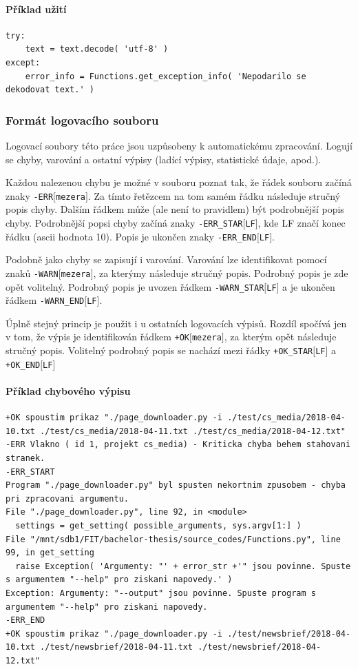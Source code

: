 \paragraph{Příklad užití}
\begin{lstlisting}
try:
    text = text.decode( 'utf-8' )
except:
    error_info = Functions.get_exception_info( 'Nepodarilo se dekodovat text.' )
\end{lstlisting}

\subsubsection{Formát logovacího souboru}
Logovací soubory této práce jsou uzpůsobeny k automatickému zpracování. Logují se
chyby, varování a ostatní výpisy (ladící výpisy, statistické údaje, apod.).

Každou nalezenou chybu je možné v souboru poznat tak, že řádek souboru
začíná znaky \texttt{-ERR$[$mezera$]$}. Za tímto řetězcem na tom samém řádku následuje
stručný popis chyby. Dalším řádkem může (ale není to pravidlem) být podrobnější popis chyby.
Podrobnější popsi chyby začíná znaky \texttt{-ERR\_STAR$[$LF$]$}, kde LF značí konec řádku (ascii hodnota 10).
Popis je ukončen znaky \texttt{-ERR\_END$[$LF$]$}.

Podobně jako chyby se zapisují i varování. Varování lze identifikovat pomocí znaků \texttt{-WARN$[$mezera$]$},
za kterýmy následuje stručný popis. Podrobný popis je zde opět volitelný. Podrobný popis je uvozen řádkem
\texttt{-WARN\_STAR$[$LF$]$} a je ukončen řádkem \texttt{-WARN\_END$[$LF$]$}.

Úplně stejný princip je použit i u ostatních logovacích výpisů. Rozdíl spočívá jen v tom, že
výpis je identifikován řádkem \texttt{+OK$[$mezera$]$}, za kterým opět následuje stručný popis.
Volitelný podrobný popis se nachází mezi řádky \texttt{+OK\_STAR$[$LF$]$} a \texttt{+OK\_END$[$LF$]$}

\paragraph{Příklad chybového výpisu}
\begin{lstlisting}
+OK spoustim prikaz "./page_downloader.py -i ./test/cs_media/2018-04-10.txt ./test/cs_media/2018-04-11.txt ./test/cs_media/2018-04-12.txt"
-ERR Vlakno ( id 1, projekt cs_media) - Kriticka chyba behem stahovani stranek.
-ERR_START
Program "./page_downloader.py" byl spusten nekortnim zpusobem - chyba pri zpracovani argumentu.
File "./page_downloader.py", line 92, in <module>
  settings = get_setting( possible_arguments, sys.argv[1:] )
File "/mnt/sdb1/FIT/bachelor-thesis/source_codes/Functions.py", line 99, in get_setting
  raise Exception( 'Argumenty: "' + error_str +'" jsou povinne. Spuste s argumentem "--help" pro ziskani napovedy.' )
Exception: Argumenty: "--output" jsou povinne. Spuste program s argumentem "--help" pro ziskani napovedy.
-ERR_END
+OK spoustim prikaz "./page_downloader.py -i ./test/newsbrief/2018-04-10.txt ./test/newsbrief/2018-04-11.txt ./test/newsbrief/2018-04-12.txt"
\end{lstlisting}

